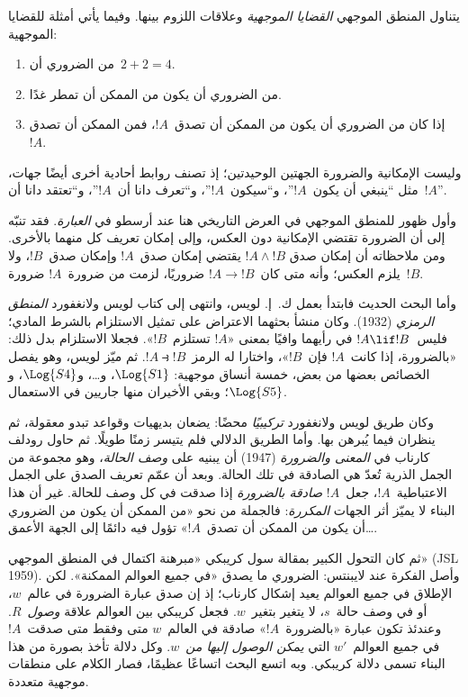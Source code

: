\documentclass[../../../include/open-logic-section]{subfiles}
\begin{document}


يتناول المنطق الموجهي \emph{القضايا الموجهية} وعلاقات اللزوم بينها.
وفيما يأتي أمثلة للقضايا الموجهية:
\begin{enumerate}
\item من الضروري أن~$2+2=4$.
\item من الضروري أن يكون من الممكن أن تمطر غدًا.
\item إذا كان من الضروري أن يكون من الممكن أن تصدق~$!A$، فمن الممكن أن تصدق~$!A$.
\end{enumerate}
وليست الإمكانية والضرورة الجهتين الوحيدتين؛ إذ تصنف روابط أحادية أخرى
أيضًا جهات، مثل ``ينبغي أن يكون~$!A$''، و``سيكون~$!A$''، و``تعرف دانا
أن~$!A$''، و``تعتقد دانا أن~$!A$''.

وأول ظهور للمنطق الموجهي في العرض التاريخي هنا عند أرسطو في
\emph{العبارة}. فقد تنبّه إلى أن الضرورة تقتضي الإمكانية دون العكس،
وإلى إمكان تعريف كل منهما بالأخرى. ومن ملاحظاته أن إمكان صدق
$!A \land !B$ يقتضي إمكان صدق~$!A$ وإمكان صدق~$!B$، ولا يلزم
العكس؛ وأنه متى كان~$!A \to !B$ ضروريًا، لزمت من ضرورة~$!A$
ضرورة~$!B$.

وأما البحث الحديث فابتدأ بعمل ك.~إ. لويس، وانتهى إلى كتاب لويس
ولانغفورد \emph{المنطق الرمزي} (1932). وكان منشأ بحثهما الاعتراض على
تمثيل الاستلزام بالشرط المادي؛ فليس~$!A \lif !B$ في رأيهما وافيًا
بمعنى «$!A$ تستلزم~$!B$». فجعلا الاستلزام بدل ذلك: «بالضرورة،
إذا كانت~$!A$ فإن~$!B$»، واختارا له الرمز~$!A \strictif !B$.
ثم ميّز لويس، وهو يفصل الخصائص بعضها من بعض، خمسة أنساق موجهية:
$\Log{S1}$، و\ldots، و$\Log{S4}$، و$\Log{S5}$؛ وبقي الأخيران
منها جاريين في الاستعمال.

وكان طريق لويس ولانغفورد \emph{تركيبيًا} محضًا: يضعان بديهيات
وقواعد تبدو معقولة، ثم ينظران فيما يُبرهن بها. وأما الطريق الدلالي
فلم يتيسر زمنًا طويلًا. ثم حاول رودلف كارناب في \emph{المعنى والضرورة}
(1947) أن يبنيه على \emph{وصف الحالة}، وهو مجموعة من الجمل الذرية
تُعدّ هي الصادقة في تلك الحالة. وبعد أن عمّم تعريف الصدق على الجمل
الاعتباطية~$!A$، جعل~$!A$ \emph{صادقة بالضرورة} إذا صدقت في كل
وصف للحالة. غير أن هذا البناء لا يميّز أثر الجهات \emph{المكررة}:
فالجملة من نحو «من الممكن أن يكون من الضروري \ldots أن يكون من الممكن أن تصدق~$!A$»
تؤول فيه دائمًا إلى الجهة الأعمق.

ثم كان التحول الكبير بمقالة سول كريبكي «مبرهنة اكتمال في المنطق
الموجهي» (JSL 1959). وأصل الفكرة عند لايبنتس: الضروري ما يصدق
«في جميع العوالم الممكنة». لكن الإطلاق في جميع العوالم يعيد إشكال
كارناب؛ إذ إن صدق عبارة الضرورة في عالم~$w$، أو في وصف حالة~$s$،
لا يتغير بتغير~$w$. فجعل كريبكي بين العوالم علاقة \emph{وصول}~$R$.
وعندئذ تكون عبارة «بالضرورة~$!A$» صادقة في العالم~$w$ متى وفقط
متى صدقت~$!A$ في جميع العوالم~$w'$ التي \emph{يمكن الوصول إليها
من}~$w$. وكل دلالة تأخذ بصورة من هذا البناء تسمى دلالة كريبكي.
وبه اتسع البحث اتساعًا عظيمًا، فصار الكلام على منطقات موجهية متعددة.
\end{document}
